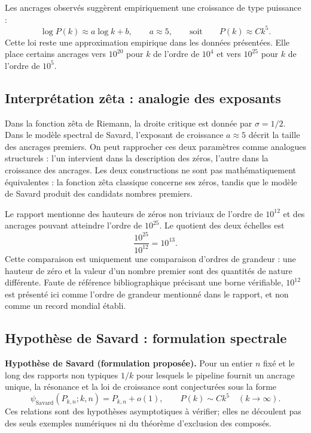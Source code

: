 \documentclass[11pt,a4paper]{article}
\begin{document}
Les ancrages observés suggèrent empiriquement une croissance de type puissance :
\[
\log P(k)\approx a\log k+b,\qquad a\approx 5,
\qquad\text{soit}\qquad P(k)\approx Ck^5.
\]
Cette loi reste une approximation empirique dans les données présentées. Elle
place certains ancrages vers $10^{20}$ pour $k$ de l'ordre de $10^4$ et vers
$10^{25}$ pour $k$ de l'ordre de $10^5$.

\subsection{Interprétation zêta : analogie des exposants}

Dans la fonction zêta de Riemann, la droite critique est donnée par
$\sigma=1/2$. Dans le modèle spectral de Savard, l'exposant de croissance
$a\approx 5$ décrit la taille des ancrages premiers. On peut rapprocher ces
deux paramètres comme analogues structurels : l'un intervient dans la
description des zéros, l'autre dans la croissance des ancrages. Les deux
constructions ne sont pas mathématiquement équivalentes : la fonction zêta
classique concerne ses zéros, tandis que le modèle de Savard produit des
candidats nombres premiers.

Le rapport mentionne des hauteurs de zéros non triviaux de l'ordre de
$10^{12}$ et des ancrages pouvant atteindre l'ordre de $10^{25}$. Le quotient
des deux échelles est
\[
\frac{10^{25}}{10^{12}}=10^{13}.
\]
Cette comparaison est uniquement une comparaison d'ordres de grandeur : une
hauteur de zéro et la valeur d'un nombre premier sont des quantités de nature
différente. Faute de référence bibliographique précisant une borne vérifiable,
$10^{12}$ est présenté ici comme l'ordre de grandeur mentionné dans le rapport,
et non comme un record mondial établi.

\subsection{Hypothèse de Savard : formulation spectrale}

\textbf{Hypothèse de Savard (formulation proposée).} Pour un entier $n$ fixé
et le long des rapports non typiques $1/k$ pour lesquels le pipeline fournit
un ancrage unique, la résonance et la loi de croissance sont conjecturées sous
la forme
\[
\psi_{\mathrm{Savard}}(P_{k,n};k,n)=P_{k,n}+o(1),
\qquad
P(k)\sim Ck^5\quad (k\to\infty).
\]
Ces relations sont des hypothèses asymptotiques à vérifier; elles ne découlent
pas des seuls exemples numériques ni du théorème d'exclusion des composés.
\end{document}
